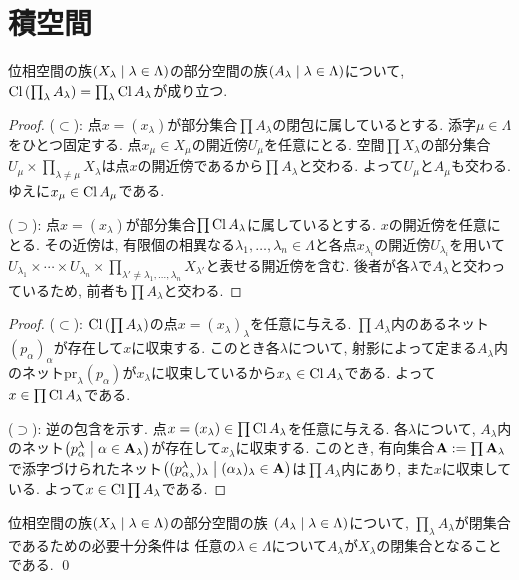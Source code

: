 \documentclass[uplatex, dvipdfmx, a4paper, 12pt, class=jsbook, crop=false]{standalone}
\begin{document}
\section{積空間}
\label{sec:product-spaces}

\newcommand{\directedA}{\mathbf{A}} %
\newcommand{\proj}{\mathrm{pr}} %

\begin{proposition}
	\label{02b3a9}
	位相空間の族$\setfamily{X_\lambda}{\lambda \in \Lambda}$の部分空間の族$\setfamily{A_\lambda}{\lambda \in \Lambda}$について, $ \mathop{\mathrm{Cl}}\nolimits \left(\prod_\lambda A_\lambda\right) = \prod_\lambda \mathop{\mathrm{Cl}}\nolimits A_\lambda $が成り立つ.
\end{proposition}

\begin{proof}
	($\subset$):
	点$x = (x_\lambda)$が部分集合$\prod A_\lambda$の閉包に属しているとする.
	添字$\mu \in \Lambda$をひとつ固定する.
	点$x_\mu \in X_\mu$の開近傍$U_\mu$を任意にとる.
	空間$\prod X_\lambda$の部分集合$U_\mu \times \prod_{\lambda \neq \mu} X_{\lambda}$は点$x$の開近傍であるから$\prod A_{\lambda}$と交わる.
	よって$U_\mu$と$A_\mu$も交わる. ゆえに$x_\mu \in \mathop{\mathrm{Cl}}\nolimits A_\mu$である.

	($\supset$):
	点$x = (x_\lambda)$が部分集合$\prod \mathop{\mathrm{Cl}}\nolimits A_\lambda$に属しているとする.
	$x$の開近傍を任意にとる.
	その近傍は, 有限個の相異なる$\lambda_1, \ldots, \lambda_n \in \Lambda$と各点$x_{\lambda_i}$の開近傍$U_{\lambda_i}$を用いて$U_{\lambda_1} \times \cdots \times U_{\lambda_n} \times \prod_{\lambda' \neq \lambda_1, \ldots, \lambda_n} X_{\lambda'}$と表せる開近傍を含む.
	後者が各$\lambda$で$A_\lambda$と交わっているため, 前者も$\prod A_\lambda$と交わる.
\end{proof}

\begin{proof}
	($\subset$):
	$\mathop{\mathrm{Cl}}\nolimits \left(\prod A_\lambda\right)$の点$x = (x_\lambda)_\lambda$を任意に与える.
	$\prod A_\lambda$内のあるネット$(p_\alpha)_\alpha$が存在して$x$に収束する.
	このとき各$\lambda$について, 射影によって定まる$A_\lambda$内のネット$\proj_\lambda (p_\alpha)$が$x_\lambda$に収束しているから$x_\lambda \in \mathop{\mathrm{Cl}}\nolimits A_\lambda$である.
	よって$x \in \prod \mathop{\mathrm{Cl}}\nolimits A_\lambda$である.

	($\supset$):
	逆の包含を示す.
	点$x = (x_\lambda) \in \prod \mathop{\mathrm{Cl}}\nolimits A_\lambda$を任意に与える.
	各$\lambda$について, $A_\lambda$内のネット$\setfamily{p^\lambda_\alpha}{\alpha \in \directedA_\lambda}$が存在して$x_\lambda$に収束する.
	このとき, 有向集合$\directedA \defeq \prod \directedA_\lambda$で添字づけられたネット$\setfamily{(p^\lambda_{\alpha_\lambda})_\lambda}{(\alpha_\lambda)_\lambda \in \directedA}$は$\prod A_\lambda$内にあり, また$x$に収束している.
	よって$x \in \mathop{\mathrm{Cl}}\nolimits \prod A_\lambda$である.
\end{proof}

\begin{corollary}
	\label{02e5k8}
	位相空間の族$ \setfamily{X_\lambda}{\lambda \in \Lambda} $の部分空間の族
	$ \setfamily{A_\lambda}{\lambda \in \Lambda} $について,
	$ \prod_\lambda A_\lambda $が閉集合であるための必要十分条件は
	任意の$ \lambda \in \Lambda $について$ A_\lambda $が$ X_\lambda $の閉集合となることである.
	\qed
\end{corollary}
\end{document}
